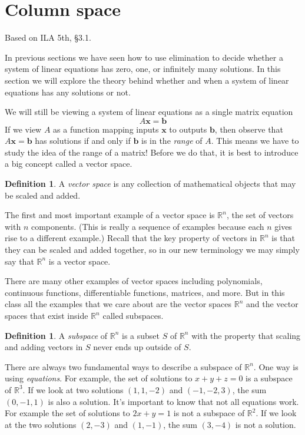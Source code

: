 \documentclass[11pt,oneside]{amsbook}
\newcommand{\R}{\mathbb R}
\theoremstyle{definition}
\theoremstyle{plain}
\theoremstyle{definition}
\newtheorem{definition}[theorem]{Definition}
\theoremstyle{remark}
\numberwithin{equation}{section}
\numberwithin{figure}{section}
\begin{document}
\newpage
\section{Column space}

Based on ILA 5th, \S 3.1.

In previous sections we have seen how to use elimination to decide whether a system of linear equations has zero, one, or infinitely many solutions. In this section we will explore the theory behind whether and when a system of linear equations has any solutions or not.

We will still be viewing a system of linear equations as a single matrix equation
\[A\bm{x}=\bm{b}
\]
If we view $A$ as a function mapping inputs $\bm{x}$ to outputs $\bm{b}$, then observe that $A\bm{x}=\bm{b}$ has solutions if and only if $\bm{b}$ is in the \emph{range} of $A$. This means we have to study the idea of the range of a matrix! Before we do that, it is best to introduce a big concept called a vector space.

\begin{definition}
  A \emph{vector space} is any collection of mathematical objects that may be scaled and added.
\end{definition}

The first and most important example of a vector space is $\R^n$, the set of vectors with $n$ components. (This is really a sequence of examples because each $n$ gives rise to a different example.) Recall that the key property of vectors in $\R^n$ is that they can be scaled and added together, so in our new terminology we may simply say that $\R^n$ is a vector space.

There are many other examples of vector spaces including polynomials, continuous functions, differentiable functions, matrices, and more. But in this class all the examples that we care about are the vector spaces $\R^n$ and the vector spaces that exist inside $\R^n$ called subspaces.

\begin{definition}
  A \emph{subspace} of $\R^n$ is a subset $S$ of $\R^n$ with the property that scaling and adding vectors in $S$ never ends up outside of $S$.
\end{definition}

There are always two fundamental ways to describe a subspace of $\R^n$. One way is using \emph{equations}. For example, the set of solutions to $x+y+z=0$ is a subspace of $\R^3$. If we look at two solutions $(1,1,-2)$ and $(-1,-2,3)$, the sum $(0,-1,1)$ is also a solution. It's important to know that not all equations work. For example the set of solutions to $2x+y=1$ is not a subspace of $\R^2$. If we look at the two solutions $(2,-3)$ and $(1,-1)$, the sum $(3,-4)$ is not a solution.
\end{document}
